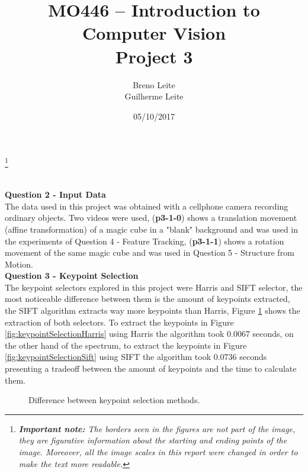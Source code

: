 \documentclass[12pt,a4paper]{article}
\title{MO446 -- Introduction to Computer Vision  \\ Project 3}
\author{Breno Leite  \\ Guilherme Leite}
\date{05/10/2017}
\newcommand\blfootnote[1]{%
	\begingroup
	\renewcommand\thefootnote{}\footnote{#1}%
	\addtocounter{footnote}{-1}%
	\endgroup
}
\begin{document}
\maketitle
\blfootnote{\textit{\textbf{Important note:} The borders seen in the figures are not part of the image, they are figurative information about the starting and ending points of the image. Moreover, all the image scales in this report were changed in order to make the text more readable.}} \\


\textbf{\LARGE Question 2 - Input Data} \\

	The data used in this project was obtained with a cellphone camera recording ordinary objects. Two videos were used, (\textbf{p3-1-0}) shows a translation movement  (affine transformation) of a magic cube in a "blank" background and was used in the experiments of Question 4 - Feature Tracking, (\textbf{p3-1-1}) shows a rotation movement of the same magic cube and was used in Question 5 - Structure from Motion.\\

\textbf{\LARGE Question 3 - Keypoint Selection} \\

	The keypoint selectors explored in this project were Harris and SIFT selector, the most noticeable difference between them is the amount of keypoints extracted, the SIFT algorithm extracts way more keypoints than Harris, Figure \ref{fig:keypointSelection} shows the extraction of both selectors. To extract the keypoints in Figure \ref{fig:keypointSelectionHarris} using Harris the algorithm took 0.0067 seconds, on the other hand of the spectrum, to extract the keypoints in Figure \ref{fig:keypointSelectionSift} using SIFT the algorithm took 0.0736 seconds presenting a tradeoff between the amount of keypoints and the time to calculate them.\\

\begin{figure}[!h]
	\centering
	\quad
	\caption{Difference between keypoint selection methods.}
	\label{fig:keypointSelection}
\end{figure}
\end{document}
